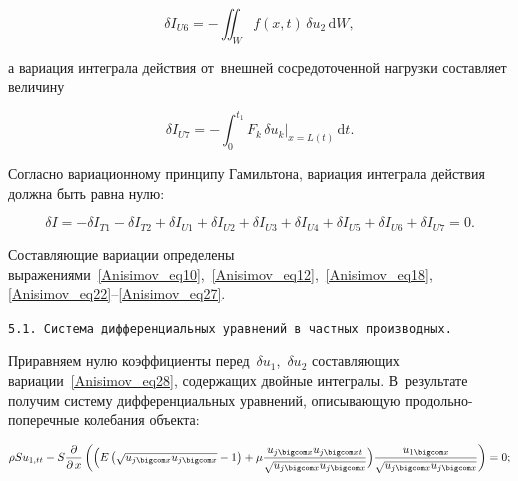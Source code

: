 \begin{equation}\label{Anisimov_eq27}

\delta I_{U6}=-\iint_{W}f( x,  t )\,\delta u_2\,\mathrm{d}W,

\end{equation}

а вариация интеграла действия от~внешней сосредоточенной нагрузки  составляет величину

\begin{equation}\label{Anisimov_eq27}

\delta I_{U7}=-\int_{0}^{t_1} F_k\,\delta u_k\big|_{x=L(t)}\,\mathrm{d}t.

\end{equation}



\smallskip



 Согласно вариационному принципу Гамильтона, вариация интеграла действия должна быть равна нулю:

\begin{equation}\label{Anisimov_eq28}

\delta I=-\delta I_{T1}-\delta I_{T2}+\delta I_{U1}+\delta I_{U2}+\delta I_{U3}+\delta I_{U4}+\delta I_{U5}+\delta I_{U6}+\delta I_{U7}=0.

\end{equation}

Составляющие вариации определены выражениями~\eqref{Anisimov_eq10},~\eqref{Anisimov_eq12},~\eqref{Anisimov_eq18}, \eqref{Anisimov_eq22}--\eqref{Anisimov_eq27}.



\smallskip



{\tt 5.1. Система дифференциальных уравнений в~частных производных.} \linebreak

 Приравняем нулю коэффициенты перед~$\delta u_1$,~$\delta u_2$ составляющих вариации~\eqref{Anisimov_eq28}, содержащих двойные интегралы. В~результате получим систему дифференциальных уравнений, описывающую продольно-поперечные колебания объекта:

\begin{equation}\label{Anisimov_eq30}

\rho Su_{1,tt} -S\frac{\partial}{\partial\,x}\left(\Bigl(E\left(\sqrt{u_{j \bigcom x}u_{j \bigcom x}}-1\right) +\mu\frac{u_{j \bigcom x}u_{j \bigcom xt}}{\sqrt{u_{j \bigcom x}u_{j \bigcom x}}}\Bigr) \frac{u_{1 \bigcom x}}{\sqrt{u_{j \bigcom x}u_{j \bigcom x}}}\right)=0;

\end{equation}

